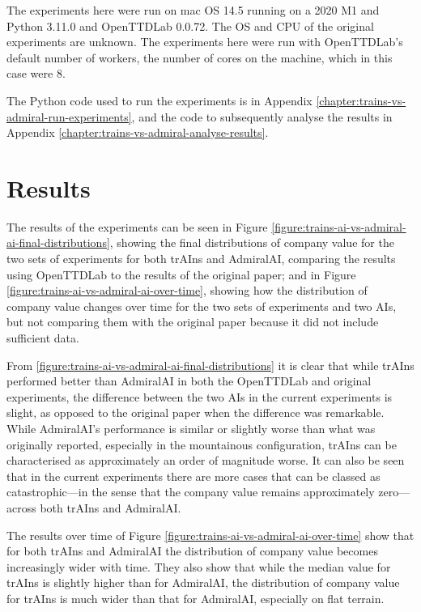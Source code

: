 \documentclass[logo,msc,dsti]{style/infthesis}    %
\begin{document}
{The experiments here were run on mac OS 14.5 running on a 2020 M1 and Python 3.11.0 and OpenTTDLab 0.0.72. The OS and CPU of the original experiments are unknown. The experiments here were run with OpenTTDLab's default number of workers, the number of cores on the machine, which in this case were 8.

The Python code used to run the experiments is in Appendix \ref{chapter:trains-vs-admiral-run-experiments}, and the code to subsequently analyse the results in Appendix \ref{chapter:trains-vs-admiral-analyse-results}.

\section{Results}

The results of the experiments can be seen in Figure \ref{figure:trains-ai-vs-admiral-ai-final-distributions}, showing the final distributions of company value for the two sets of experiments for both trAIns and AdmiralAI, comparing the results using OpenTTDLab to the results of the original paper; and in Figure \ref{figure:trains-ai-vs-admiral-ai-over-time}, showing how the distribution of company value changes over time for the two sets of experiments and two AIs, but not comparing them with the original paper because it did not include sufficient data.

From \ref{figure:trains-ai-vs-admiral-ai-final-distributions} it is clear that while trAIns performed better than AdmiralAI in both the OpenTTDLab and original experiments, the difference between the two AIs in the current experiments is slight, as opposed to the original paper when the difference was remarkable. While AdmiralAI's performance is similar or slightly worse than what was originally reported, especially in the mountainous configuration, trAIns can be characterised as approximately an order of magnitude worse. It can also be seen that in the current experiments there are more cases that can be classed as catastrophic---in the sense that the company value remains approximately zero---across both trAIns and AdmiralAI.

The results over time of Figure \ref{figure:trains-ai-vs-admiral-ai-over-time} show that for both trAIns and AdmiralAI the distribution of company value becomes increasingly wider with time. They also show that while the median value for trAIns is slightly higher than for AdmiralAI, the distribution of company value for trAIns is much wider than that for AdmiralAI, especially on flat terrain.

}
\end{document}
